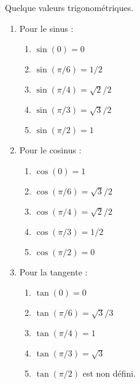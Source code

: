 \begin{proposition}
    Quelque valeurs trigonométriques.
    \begin{multicols}{2}
    \begin{enumerate}
        \item
            Pour le sinus :
            \begin{enumerate}
                \item
                    \( \sin(0)=0\)
                \item
                    \( \sin(\pi/6)=1/2\)
                \item
                    \( \sin(\pi/4)=\sqrt{ 2 }/2\)
                \item
                    \( \sin(\pi/3)=\sqrt{ 3 }/2\)
                \item
                    \( \sin(\pi/2)=1\)
            \end{enumerate}
            
        \item
            Pour le cosinus :
            \begin{enumerate}
                \item
                    \( \cos(0)=1\)
                \item
                    \( \cos(\pi/6)=\sqrt{ 3 }/2\)
                \item
                    \( \cos(\pi/4)=\sqrt{ 2 }/2\)
                \item
                    \( \cos(\pi/3)=1/2\)
                \item
                    \( \cos(\pi/2)=0\)
            \end{enumerate}
        \item
            Pour la tangente :
            \begin{enumerate}
                \item
                    \( \tan(0)=0\)
                \item
                    \( \tan(\pi/6)=\sqrt{ 3 }/3\)
                \item
                    \( \tan(\pi/4)=1\)
                \item
                    \( \tan(\pi/3)=\sqrt{ 3 }\)
                \item
                    \( \tan(\pi/2)\) est non défini.
            \end{enumerate}
    \end{enumerate}
\end{multicols}
\end{proposition}


